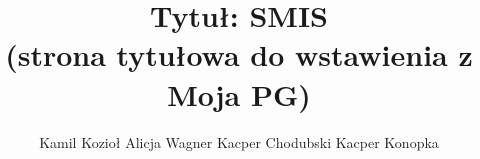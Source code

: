 \title { 
Tytuł: SMIS\\(strona tytułowa do wstawienia z Moja PG)
}
\author {
Kamil Kozioł
Alicja Wagner
Kacper Chodubski
Kacper Konopka
}
\maketitle
